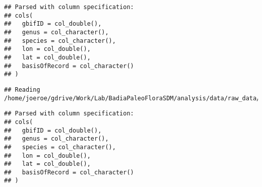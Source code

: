 \documentclass[]{article}
\begin{document}
\begin{verbatim}
## Parsed with column specification:
## cols(
##   gbifID = col_double(),
##   genus = col_character(),
##   species = col_character(),
##   lon = col_double(),
##   lat = col_double(),
##   basisOfRecord = col_character()
## )
\end{verbatim}

\begin{verbatim}
## Reading /home/joeroe/gdrive/Work/Lab/BadiaPaleoFloraSDM/analysis/data/raw_data/gbif/gbif_fraxinus.csv
\end{verbatim}

\begin{verbatim}
## Parsed with column specification:
## cols(
##   gbifID = col_double(),
##   genus = col_character(),
##   species = col_character(),
##   lon = col_double(),
##   lat = col_double(),
##   basisOfRecord = col_character()
## )
\end{verbatim}
\end{document}
